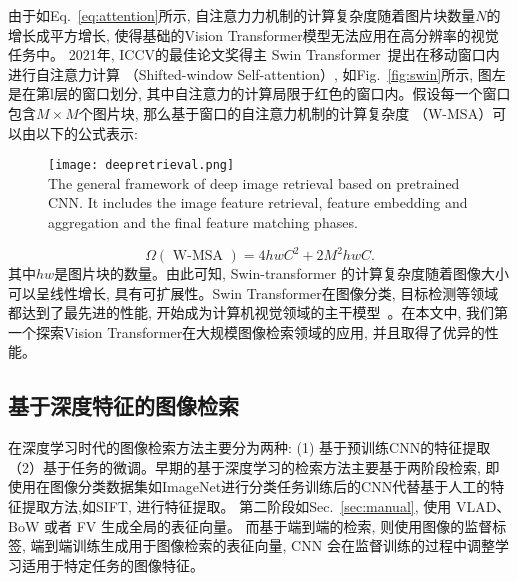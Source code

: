 由于如Eq.~\ref{eq:attention}所示, 自注意力力机制的计算复杂度随着图片块数量$N$的增长成平方增长, 使得基础的Vision Transformer模型无法应用在高分辨率的视觉任务中。 2021年, ICCV的最佳论文奖得主 Swin Transformer~\cite{liu2021swin}提出在移动窗口内进行自注意力计算 （Shifted-window Self-attention）, 如Fig.~\ref{fig:swin}所示, 图左是在第l层的窗口划分, 其中自注意力的计算局限于红色的窗口内。假设每一个窗口包含$M \times M$个图片块, 那么基于窗口的自注意力机制的计算复杂度 （W-MSA）可以由以下的公式表示:

\begin{figure}[!htp]
    \centering
    \texttt{[image: deepretrieval.png]} \\
      {The general framework of deep image retrieval based on pretrained CNN. It includes the image feature retrieval, feature embedding and aggregation and the final feature matching phases. }
   \label{fig:retrieval}
\end{figure}

\begin{equation}
    \Omega(\text { W-MSA })=4 h w C^2+2 M^2 hwC.
\end{equation}
其中$hw$是图片块的数量。由此可知, Swin-transformer 的计算复杂度随着图像大小可以呈线性增长, 具有可扩展性。Swin Transformer在图像分类, 目标检测等领域都达到了最先进的性能, 开始成为计算机视觉领域的主干模型~\cite{tianyonglin22,xsx2022,cyf2023,sxf2023,yuhang2021,  jfh2021, wfp2022,  liu2021swinnet,liu2022video, huang2022swin, cao2021swin, ma2022swinfusion}。在本文中, 我们第一个探索Vision Transformer在大规模图像检索领域的应用, 并且取得了优异的性能。

\subsection{基于深度特征的图像检索}
在深度学习时代的图像检索方法主要分为两种: (1) 基于预训练CNN的特征提取 （2）基于任务的微调。早期的基于深度学习的检索方法主要基于两阶段检索, 即使用在图像分类数据集如ImageNet进行分类任务训练后的CNN代替基于人工的特征提取方法,如SIFT, 进行特征提取。 第二阶段如Sec.~\ref{sec:manual}, 使用 VLAD、 BoW 或者 FV 生成全局的表征向量。 而基于端到端的检索, 则使用图像的监督标签, 端到端训练生成用于图像检索的表征向量, CNN 会在监督训练的过程中调整学习适用于特定任务的图像特征。

